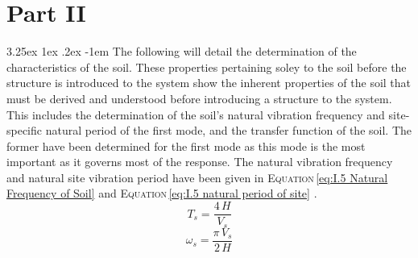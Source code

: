 \documentclass[11pt,a4paper,titlepage]{report}
\makeatletter
\renewcommand\paragraph{\@startsection{paragraph}{5}{\z@}%
  {3.25ex \@plus1ex \@minus.2ex}%
  {-1em}%
  {\normalfont\normalsize\bfseries}}
\makeatother
\begin{document}
\section{Part II}
\paragraph{}The following will detail the determination of the characteristics of the soil. These properties pertaining soley to the soil before the structure is introduced to the system show the inherent properties of the soil that must be derived and understood before introducing a structure to the system. This includes the determination of the soil's natural vibration frequency and site-specific natural period of the first mode, and the transfer function of the soil. The former have been determined for the first mode as this mode is the most important as it governs most of the response. The natural vibration frequency and natural site vibration period have been given in \textsc{Equation}\,\eqref{eq:I.5 Natural Frequency of Soil} and  \textsc{Equation}\,\eqref{eq:I.5 natural period of site} \cite{Soil}.
\begin{equation}
    T_s=\dfrac{4\,H}{V_s}
    \label{eq:I.5 Natural Frequency of Soil}
\end{equation}
\begin{equation}
    \omega_s=\dfrac{\pi\,V_s}{2\,H}
    \label{eq:I.5 natural period of site}
\end{equation}
\end{document}
